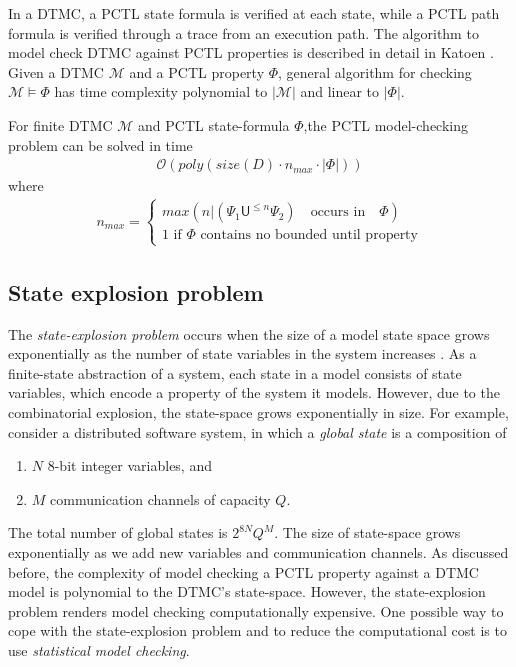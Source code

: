 \noindent  In a DTMC, a PCTL state formula is verified at each state, while a PCTL path formula is
verified through a trace from an execution path. The algorithm to model check DTMC against PCTL
properties is described in detail in Katoen \cite{baier2008principles}. Given a DTMC $\mathcal{M}$
and a PCTL property $\Phi$, general algorithm for checking $\mathcal{M}\models\Phi$ has time
complexity polynomial to $|\mathcal{M}|$ and linear to $|\Phi|$.
\begin{theorem}
      For finite DTMC $\mathcal{M}$ and PCTL state-formula $\Phi$,the PCTL model-checking problem
      can be solved in time
      \begin{align*}
            \mathcal{O}(poly(size(D)\cdot n_{max} \cdot |\Phi|))
      \end{align*}
      where
      \begin{align*}
            n_{max} =
            \begin{cases}
                  max(n | (\Psi_1 \mathsf{U}^{\leq n} \Psi_2) \quad\text{occurs in}\quad \Phi) \\
                  1 \text{ if $\Phi$ contains no bounded until property}
            \end{cases}
      \end{align*}
\end{theorem}

\subsection{State explosion problem}
The \textit{state-explosion problem} occurs when the size of a model state space grows exponentially
as the number of state variables in the system increases \cite{clarke2011model}. As a finite-state
abstraction of a system, each state in a model consists of state variables, which encode a property
of the system it models. However, due to the combinatorial explosion, the state-space grows
exponentially in size. For example, consider a distributed software system, in which a
\textit{global state} is a composition of
\begin{enumerate}
      \item $N$ 8-bit integer variables, and
      \item $M$ communication channels of capacity $Q$.
\end{enumerate}
The total number of global states is $2^{8N}Q^M$. The size of state-space grows exponentially as we
add new variables and communication channels. As discussed before, the complexity of model
checking a PCTL property against a DTMC model is polynomial to the DTMC's state-space. However, the
state-explosion problem renders model checking computationally expensive. One possible way to cope
with the state-explosion problem and to reduce the computational cost is to use \textit{statistical
      model checking}.

